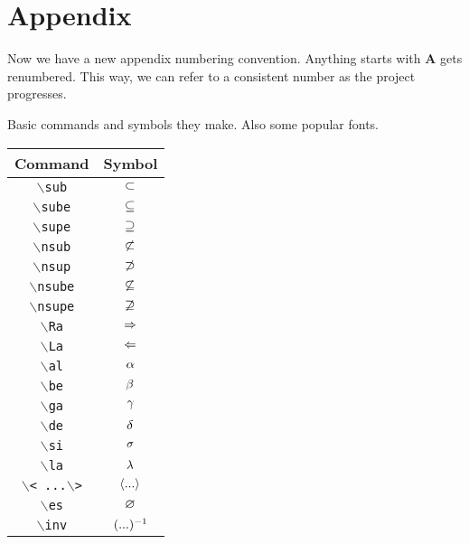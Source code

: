 \documentclass[10pt]{article}
\begin{document}
\section*{Appendix} 
\begin{atheorem}
    Now we have a new appendix numbering convention. Anything starts with $\textbf{A}$ gets renumbered. This way, we can refer to a consistent number as the project progresses.
\end{atheorem}
Basic commands and symbols they make. Also some popular fonts.
\begin{center}
    \begin{tabular}{|c|c|}
        \hline
        Command & Symbol \\
        \hline
        \texttt{$\backslash $sub} & $\subset$ \\
        \hline
        \texttt{$\backslash $sube} & $\subseteq$ \\
        \hline
        \texttt{$\backslash $supe} & $\supseteq$ \\
        \hline
        \texttt{$\backslash $nsub} & $\nsub$ \\
        \hline
        \texttt{$\backslash $nsup} & $\nsup$ \\
        \hline
        \texttt{$\backslash $nsube} & $\nsube$ \\
        \hline
        \texttt{$\backslash $nsupe} & $\nsupe$ \\
        \hline
        \texttt{$\backslash $Ra} & $\Rightarrow$ \\
        \hline
        \texttt{$\backslash $La} & $\Leftarrow$ \\
        \hline
        \texttt{$\backslash $al} & $\alpha$ \\
        \hline
        \texttt{$\backslash $be} & $\beta$ \\
        \hline
        \texttt{$\backslash $ga} & $\gamma$ \\
        \hline
        \texttt{$\backslash $de} & $\delta$ \\
        \hline
        \texttt{$\backslash $si} & $\sigma$ \\
        \hline
        \texttt{$\backslash $la} & $\lambda$ \\
        \hline
        \texttt{$\backslash $< ...$\backslash $>} & $\left\langle...\right\rangle$ \\
        \hline
        \texttt{$\backslash$es} & $\varnothing$ \\
        \hline
        \texttt{$\backslash $inv} & $(...)^{-1}$ \\

\end{tabular}
\end{center}
\end{document}
